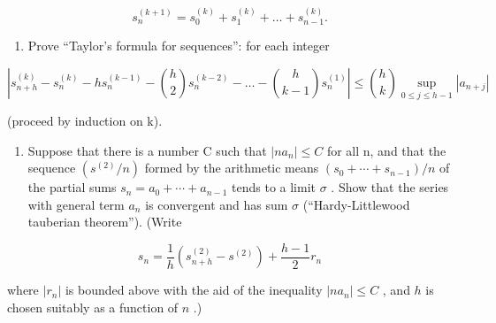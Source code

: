 \[
s _ {n} ^ {(k + 1)} = s _ {0} ^ {(k)} + s _ {1} ^ {(k)} + \dots + s _ {n - 1} ^ {(k)}.
\]

\begin{enumerate}
\def\labelenumi{\alph{enumi})}
\tightlist
\item
  Prove ``Taylor's formula for sequences'': for each integer
\end{enumerate}

\[
\left| s _ {n + h} ^ {(k)} - s _ {n} ^ {(k)} - h s _ {n} ^ {(k - 1)} - \binom {h} {2} s _ {n} ^ {(k - 2)} - \dots - \binom {h} {k - 1} s _ {n} ^ {(1)} \right| \leqslant \binom {h} {k} \sup _ {0 \leqslant j \leqslant h - 1} | a _ {n + j} |
\]

(proceed by induction on k).

\begin{enumerate}
\def\labelenumi{\alph{enumi})}
\setcounter{enumi}{1}
\tightlist
\item
  Suppose that there is a number C such that \(|na_{n}| \leqslant C\) for all n, and that the sequence \((s^{(2)}/n)\) formed by the arithmetic means \((s_{0} + \cdots + s_{n-1})/n\) of the partial sums \(s_{n} = a_{0} + \cdots + a_{n-1}\) tends to a limit \(\sigma\) . Show that the series with general term \(a_{n}\) is convergent and has sum \(\sigma\) (``Hardy-Littlewood tauberian theorem''). (Write
\end{enumerate}

\[
s _ {n} = \frac {1}{h} \left(s _ {n + h} ^ {(2)} - s ^ {(2)}\right) + \frac {h - 1}{2} r _ {n}
\]

where \(|r_n|\) is bounded above with the aid of the inequality \(|na_n| \leqslant C\) , and \(h\) is chosen suitably as a function of \(n\) .)

\setcounter{exercisegroup}{3}
